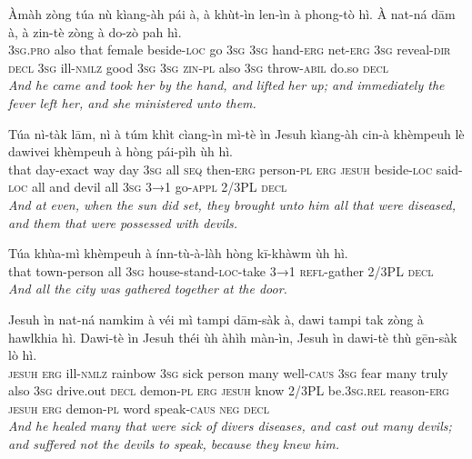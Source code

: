 \documentclass[11pt,a4paper]{article}
\begin{document}
\begin{exe}
\gll Àmàh zòng túa nù kìang-àh pái à, à khùt-ìn len-ìn à phong-tò hì. À nat-ná dām à, à zin-tè zòng à do-zò pah hì. \\
     \textsc{3sg}.\textsc{pro} also that female beside-\textsc{loc} go \textsc{3sg} \textsc{3sg} hand-\textsc{erg} net-\textsc{erg} \textsc{3sg} reveal-\textsc{dir} \textsc{decl} \textsc{3sg} ill-\textsc{nmlz} good \textsc{3sg} \textsc{3sg} \textsc{zin}-\textsc{pl} also \textsc{3sg} throw-\textsc{abil} do.so \textsc{decl} \\
\glt \textcolor{kjvcolor}{\textit{And he came and took her by the hand, and lifted her up; and immediately the fever left her, and she ministered unto them.}}

\gll Túa nì-tàk lām, nì à túm khìt cìang-ìn mì-tè ìn Jesuh kìang-àh cin-à khèmpeuh lè dawivei khèmpeuh à hòng pái-pìh ùh hì. \\
     that day-exact way day \textsc{3sg} all \textsc{seq} then-\textsc{erg} person-\textsc{pl} \textsc{erg} \textsc{jesuh} beside-\textsc{loc} said-\textsc{loc} all and devil all \textsc{3sg} \textsc{3→1} go-\textsc{appl} 2/3PL \textsc{decl} \\
\glt \textcolor{kjvcolor}{\textit{And at even, when the sun did set, they brought unto him all that were diseased, and them that were possessed with devils.}}

\gll Túa khùa-mì khèmpeuh à ínn-tù-à-làh hòng kī-khàwm ùh hì. \\
     that town-person all \textsc{3sg} house-stand-\textsc{loc}-take \textsc{3→1} \textsc{refl}-gather 2/3PL \textsc{decl} \\
\glt \textcolor{kjvcolor}{\textit{And all the city was gathered together at the door.}}

\gll Jesuh ìn nat-ná namkim à véi mì tampi dām-sàk à, dawi tampi tak zòng à hawlkhia hì. Dawi-tè ìn Jesuh théi ùh àhìh màn-ìn, Jesuh ìn dawi-tè thù gēn-sàk lò hì. \\
     \textsc{jesuh} \textsc{erg} ill-\textsc{nmlz} rainbow \textsc{3sg} sick person many well-\textsc{caus} \textsc{3sg} fear many truly also \textsc{3sg} drive.out \textsc{decl} demon-\textsc{pl} \textsc{erg} \textsc{jesuh} know 2/3PL be.\textsc{3sg}.\textsc{rel} reason-\textsc{erg} \textsc{jesuh} \textsc{erg} demon-\textsc{pl} word speak-\textsc{caus} \textsc{neg} \textsc{decl} \\
\glt \textcolor{kjvcolor}{\textit{And he healed many that were sick of divers diseases, and cast out many devils; and suffered not the devils to speak, because they knew him.}}


\end{exe}
\end{document}

